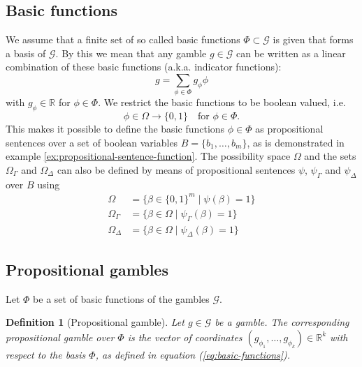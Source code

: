 \documentclass{article}
\theoremstyle{mytheorem}
\newtheorem{definition}[theorem]{Definition}
\newcommand{\set}[1]{\ensuremath{\{ #1 \} }} %
\begin{document}
\subsection{Basic functions}
We assume that a finite set of so called basic functions $\Phi \subset \mathcal{G}$ is given that forms a basis of $\mathcal{G}$. By this we mean that any gamble $g \in \mathcal{G}$ can be written as a linear combination of these basic functions (a.k.a. indicator functions):
\begin{equation} \label{eq:basic-functions}
  g = \sum\limits_{\phi \in \Phi} g_\phi \phi
\end{equation}
with $g_\phi \in \mathbb{R}$ for $\phi \in \Phi$.
We restrict the basic functions to be boolean valued, i.e.
\[
  \phi \in \Omega \rightarrow \set{0,1} \quad \text{for } \phi \in \Phi.
\]
This makes it possible to define the basic functions $\phi \in \Phi$ as propositional sentences over a set of boolean variables $B = \set{b_1, \ldots, b_m}$, as is demonstrated in example \ref{ex:propositional-sentence-function}.
The possibility space $\Omega$ and the sets $\Omega_\Gamma$ and $\Omega_\Delta$ can also be defined by means of propositional sentences $\psi$, $\psi_\Gamma$ and $\psi_\Delta$ over $B$ using
\begin{align}
\Omega &= \set{ \beta \in \set{0,1}^m \mid \psi(\beta) = 1 } \\
\Omega_\Gamma &= \set{\beta \in \Omega \mid \psi_\Gamma(\beta) = 1} \\
\Omega_\Delta &= \set{\beta \in \Omega \mid \psi_\Delta(\beta) = 1}
\end{align}

\subsection{Propositional gambles}
Let $\Phi$ be a set of basic functions of the gambles $\mathcal{G}$.

\begin{definition}[Propositional gamble]
Let $g \in \mathcal{G}$ be a gamble. The corresponding \emph{propositional gamble} over $\Phi$ is the vector of coordinates $(g_{\phi_1}, \ldots, g_{\phi_k}) \in \mathbb{R}^k$ with respect to the basis $\Phi$, as defined in equation (\ref{eq:basic-functions}).
\end{definition}
\end{document}
